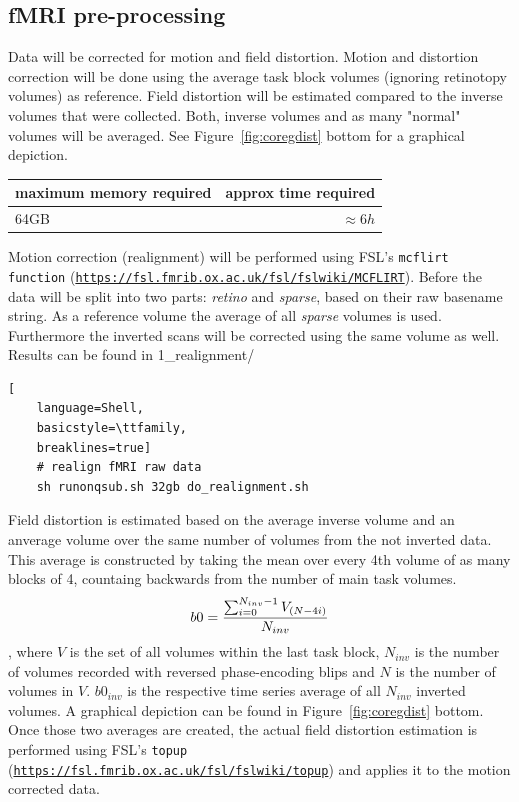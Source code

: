 \documentclass[12pt,a4paper]{scrartcl}
\begin{document}
\subsection{fMRI pre-processing}
Data will be corrected for motion and field distortion. Motion and distortion correction will be done using the average task block volumes (ignoring retinotopy volumes) as reference. Field distortion will be estimated compared to the inverse volumes that were collected. Both, inverse volumes and as many "normal" volumes will be averaged. See Figure~\ref{fig:coregdist} bottom for a graphical depiction.
\begin{table}[h]
\begin{tabular}{l | r}
\toprule
maximum memory required & approx time required\\\toprule
64GB & $\approx 6h$ \\\bottomrule
\end{tabular}
\end{table}
\FloatBarrier
\noindent Motion correction (realignment) will be performed using FSL's \texttt{mcflirt function} (\href{https://fsl.fmrib.ox.ac.uk/fsl/fslwiki/MCFLIRT}{\nolinkurl{https://fsl.fmrib.ox.ac.uk/fsl/fslwiki/MCFLIRT}}). Before the data will be split into two parts: \textit{retino} and  \textit{sparse}, based on their raw basename string. As a reference volume the average of all \textit{sparse} volumes is used. Furthermore the inverted scans will be corrected using the same volume as well.\\

\noindent Results can be found in 1\_realignment/\\
\begin{lstlisting}[
    language=Shell,
    basicstyle=\ttfamily,
    breaklines=true]
    # realign fMRI raw data
    sh runonqsub.sh 32gb do_realignment.sh
\end{lstlisting}
Field distortion is estimated based on the average inverse volume and an anverage volume over the same number of volumes from the not inverted data. This average is constructed by taking the mean over every 4th volume of as many blocks of 4, countaing backwards from the number of main task volumes.
\begin{equation}
\centering
b0=\frac{\sum_{i=0}^{N_{inv}-1}V_{(N-4i)}}{N_{inv}}
\end{equation}
\noindent, where $V$ is the set of all volumes within the last task block, $N_{inv}$ is the number of volumes recorded with reversed phase-encoding blips and $N$ is the number of volumes in $V$. $b0_{inv}$ is the respective time series average of all $N_{inv}$ inverted volumes. A graphical depiction can be found in Figure~\ref{fig:coregdist} bottom. Once those two averages are created, the actual field distortion estimation is performed using FSL's \texttt{topup} (\href{https://fsl.fmrib.ox.ac.uk/fsl/fslwiki/topup}{\nolinkurl{https://fsl.fmrib.ox.ac.uk/fsl/fslwiki/topup}}) and applies it to the motion corrected data.\\
\end{document}
